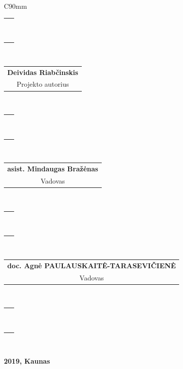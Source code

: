 \begin{titlepage}
\begin{center}
     \singlespacing
     \begin{table}[H]
       \centering
      \begin{tabular}{C{90mm}}
      \hline
      \begin{tabular}{@{}c@{}}~\\~\end{tabular} \\
      \begin{tabular}{@{}c@{}}\textbf{Deividas Riabčinskis}\\Projekto autorius\end{tabular} \\
      \begin{tabular}{@{}c@{}}~\\~\end{tabular} \\
      \begin{tabular}{@{}c@{}}\textbf{asist. Mindaugas Bražėnas}\\Vadovas\end{tabular} \\
        \begin{tabular}{@{}c@{}}~\\~\end{tabular} \\
        \begin{tabular}{@{}c@{}}\textbf{doc. Agnė PAULAUSKAITĖ-TARASEVIČIENĖ}\\Vadovas\end{tabular} \\
      \begin{tabular}{@{}c@{}}~\\~\end{tabular} \\ \hline
      \end{tabular}
    \end{table}

\onehalfspacing

     \vfill

     \textbf{2019, Kaunas}

   \end{center}
\end{titlepage}
